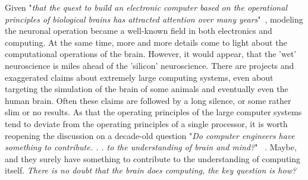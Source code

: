 Given "\textit{that the quest to build an electronic computer based on the operational principles of biological brains has attracted attention over many years}"~\cite{FurberNeuralEngineering:2007}, modeling the neuronal operation became
a well-known field in both electronics and computing. At the same time, more and more details come to light about the 
computational operations of the brain. However, it would appear, that the 'wet' neuroscience
is miles ahead of the 'silicon' neuroscience. 
There are projects and exaggerated claims about extremely large computing systems,
even about targeting the simulation of the
brain of some animals and eventually even the human brain. 
Often these claims are followed by a long silence, or some rather slim or no results.
As that the operating principles of the large computer systems tend to deviate from the operating principles of a single processor,
it is worth reopening the discussion on a decade-old question
"\textit{Do computer engineers have something to contribute. . . to the understanding of brain and mind?}"
~\cite{FurberNeuralEngineering:2007}.
Maybe, and they surely have something to contribute to the understanding of computing itself.
\textit{There is no doubt that the brain does computing, the key question is how?}

